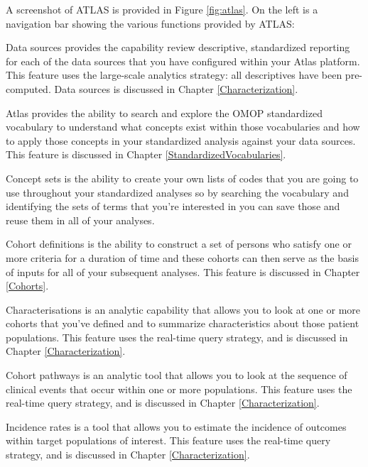 \documentclass[11pt]{book}
\providecommand{\tightlist}{%
  \setlength{\itemsep}{0pt}\setlength{\parskip}{0pt}}
\theoremstyle{definition}
\theoremstyle{definition}
\theoremstyle{definition}
\theoremstyle{remark}
\begin{document}
A screenshot of ATLAS is provided in Figure \ref{fig:atlas}. On the left is a navigation bar showing the various functions provided by ATLAS:

\begin{description}
\tightlist
\item[Data Sources]
Data sources provides the capability review descriptive, standardized reporting for each of the data sources that you have configured within your Atlas platform. This feature uses the large-scale analytics strategy: all descriptives have been pre-computed. Data sources is discussed in Chapter \ref{Characterization}.
\item[Vocabulary Search]
Atlas provides the ability to search and explore the OMOP standardized vocabulary to understand what concepts exist within those vocabularies and how to apply those concepts in your standardized analysis against your data sources. This feature is discussed in Chapter \ref{StandardizedVocabularies}.
\item[Concept Sets]
Concept sets is the ability to create your own lists of codes that you are going to use throughout your standardized analyses so by searching the vocabulary and identifying the sets of terms that you're interested in you can save those and reuse them in all of your analyses.
\item[Cohort Definitions]
Cohort definitions is the ability to construct a set of persons who satisfy one or more criteria for a duration of time and these cohorts can then serve as the basis of inputs for all of your subsequent analyses. This feature is discussed in Chapter \ref{Cohorts}.
\item[Characterizations]
Characterisations is an analytic capability that allows you to look at one or more cohorts that you've defined and to summarize characteristics about those patient populations. This feature uses the real-time query strategy, and is discussed in Chapter \ref{Characterization}.
\item[Cohort Pathways]
Cohort pathways is an analytic tool that allows you to look at the sequence of clinical events that occur within one or more populations. This feature uses the real-time query strategy, and is discussed in Chapter \ref{Characterization}.
\item[Incidence Rates]
Incidence rates is a tool that allows you to estimate the incidence of outcomes within target populations of interest. This feature uses the real-time query strategy, and is discussed in Chapter \ref{Characterization}.
\item[Profiles]

\end{description}
\end{document}
